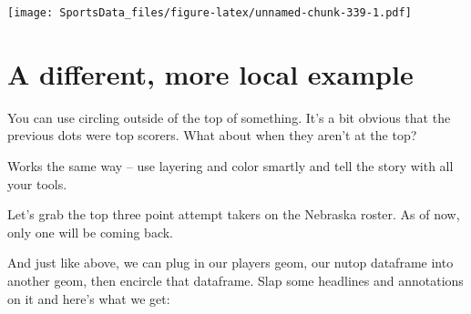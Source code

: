 \documentclass[]{book}
\newenvironment{Shaded}{\begin{snugshade}}{\end{snugshade}}
\newcommand{\DataTypeTok}[1]{\textcolor[rgb]{0.13,0.29,0.53}{#1}}
\newcommand{\DecValTok}[1]{\textcolor[rgb]{0.00,0.00,0.81}{#1}}
\newcommand{\KeywordTok}[1]{\textcolor[rgb]{0.13,0.29,0.53}{\textbf{#1}}}
\newcommand{\NormalTok}[1]{#1}
\newcommand{\OperatorTok}[1]{\textcolor[rgb]{0.81,0.36,0.00}{\textbf{#1}}}
\newcommand{\StringTok}[1]{\textcolor[rgb]{0.31,0.60,0.02}{#1}}
\begin{document}
\texttt{[image: SportsData\_files/figure-latex/unnamed-chunk-339-1.pdf]}

\hypertarget{a-different-more-local-example}{%
\section{A different, more local example}\label{a-different-more-local-example}}

You can use circling outside of the top of something. It's a bit obvious that the previous dots were top scorers. What about when they aren't at the top?

Works the same way -- use layering and color smartly and tell the story with all your tools.

Let's grab the top three point attempt takers on the Nebraska roster. As of now, only one will be coming back.

\begin{Shaded}
\end{Shaded}

And just like above, we can plug in our players geom, our nutop dataframe into another geom, then encircle that dataframe. Slap some headlines and annotations on it and here's what we get:
\end{document}
